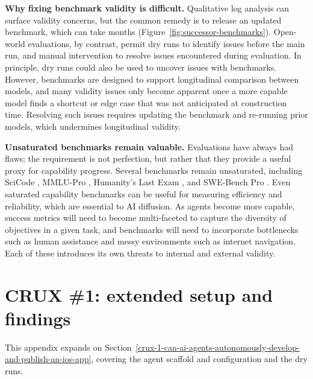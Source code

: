 \documentclass{article}
\begin{document}
\textbf{Why fixing benchmark validity is difficult.} Qualitative log analysis \citep{aisiGovUkBlog} can surface validity concerns, but the common remedy is to release an updated benchmark, which can take months (Figure~\ref{fig:successor-benchmarks}). Open-world evaluations, by contrast, permit dry runs to identify issues before the main run, and manual intervention to resolve issues encountered during evaluation. In principle, dry runs could also be used to uncover issues with benchmarks. However, benchmarks are designed to support longitudinal comparison between models, and many validity issues only become apparent once a more capable model finds a shortcut or edge case that was not anticipated at construction time. Resolving such issues requires updating the benchmark and re-running prior models, which undermines longitudinal validity.

\textbf{Unsaturated benchmarks remain valuable.} Evaluations have always had flaws; the requirement is not perfection, but rather that they provide a useful proxy for capability progress. Several benchmarks remain unsaturated, including SciCode \citep{arxivabs240713168}, MMLU-Pro \citep{arxivabs240601574}, Humanity's Last Exam \citep{arxivabs250114249}, and SWE-Bench Pro \citep{arxivabs250916941}. Even saturated capability benchmarks can be useful for measuring efficiency and reliability, which are essential to AI diffusion. As agents become more capable, success metrics will need to become multi-faceted to capture the diversity of objectives in a given task, and benchmarks will need to incorporate bottlenecks such as human assistance and messy environments such as internet navigation. Each of these introduces its own threats to internal and external validity.

\section{CRUX \#1: extended setup and findings}\label{app:crux1-extras}

This appendix expands on Section~\ref{crux-1-can-ai-agents-autonomously-develop-and-publish-an-ios-app}, covering the agent scaffold and configuration and the dry runs.
\end{document}
